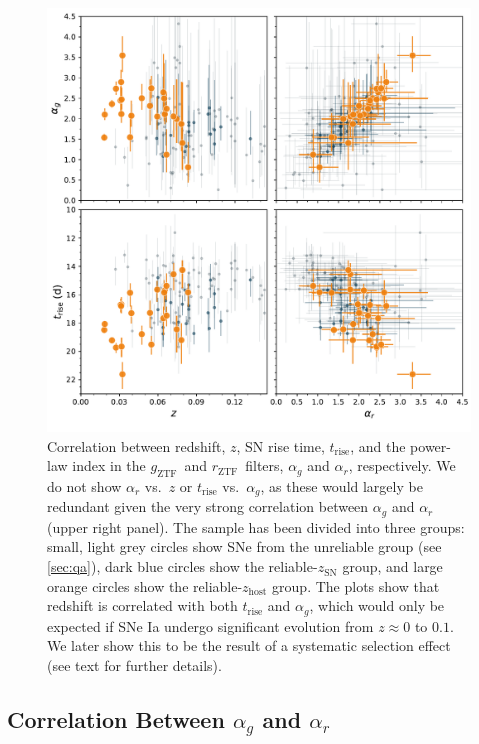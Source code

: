 \documentclass[twocolumn]{./aastex63}
\newcommand{\rztf}{$r_\mathrm{ZTF}$}
\newcommand{\gztf}{$g_\mathrm{ZTF}$}
\begin{document}
\begin{figure}
    \centering
    \includegraphics[width=6in]{./figures/param_correlations.pdf}
    \caption{Correlation between redshift, $z$, SN rise time,
    $t_\mathrm{rise}$, and the power-law index in the \gztf\ and \rztf\
    filters, $\alpha_g$ and $\alpha_r$, respectively. We do not show
    $\alpha_r$ vs.~$z$ or $t_\mathrm{rise}$ vs.~$\alpha_g$, as these would
    largely be redundant given the very strong correlation between $\alpha_g$
    and $\alpha_r$ (upper right panel). The sample has been divided into three
    groups: small, light grey circles show SNe from the unreliable group (see
    \ref{sec:qa}), dark blue circles show the reliable-$z_\mathrm{SN}$ group,
    and large orange circles show the reliable-$z_\mathrm{host}$ group. The
    plots show that redshift is correlated with both $t_\mathrm{rise}$ and
    $\alpha_g$, which would only be expected if SNe Ia undergo significant
    evolution from $z \approx 0$ to $0.1$. We later show this to be the result
    of a systematic selection effect (see text for further details). }
    \label{fig:model_parameters}
\end{figure}

\subsection{Correlation Between $\alpha_g$ and $\alpha_r$}\label{sec:alpha_correlation}
\end{document}

